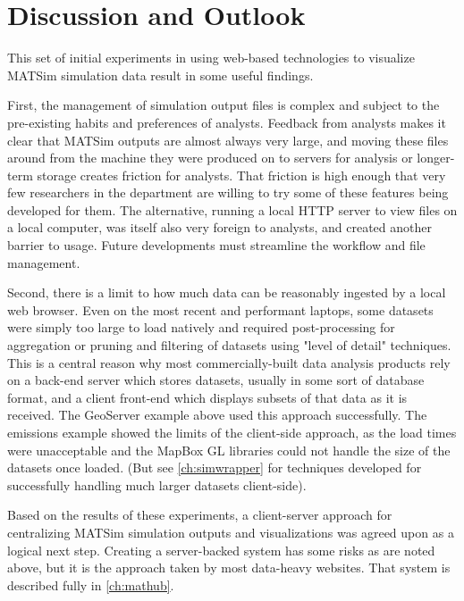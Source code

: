 \hypertarget{server-experiments-findings}{%
\section{Discussion and Outlook}\label{server-experiments-findings}}

This set of initial experiments in using web-based technologies to visualize MATSim simulation data result in some useful findings.

First, the management of simulation output files is complex and subject to the pre-existing habits and preferences of analysts. Feedback from analysts makes it clear that MATSim outputs are almost always very large, and moving these files around from the machine they were produced on to servers for analysis or longer-term storage creates friction for analysts. That friction is high enough that very few researchers in the department are willing to try some of these features being developed for them. The alternative, running a local HTTP server to view files on a local computer, was itself also very foreign to analysts, and created another barrier to usage. Future developments must streamline the workflow and file management.

Second, there is a limit to how much data can be reasonably ingested by a local web browser. Even on the most recent and performant laptops, some datasets were simply too large to load natively and required post-processing for aggregation or pruning and filtering of datasets using "level of detail" techniques. This is a central reason why most commercially-built data analysis products rely on a back-end server which stores datasets, usually in some sort of database format, and a client front-end which displays subsets of that data as it is received. The GeoServer example above used this approach successfully. The emissions example showed the limits of the client-side approach, as the load times were unacceptable and the MapBox GL libraries could not handle the size of the datasets once loaded. (But see \autoref{ch:simwrapper} for techniques developed for successfully handling much larger datasets client-side).

Based on the results of these experiments, a client-server approach for centralizing MATSim simulation outputs and visualizations was agreed upon as a logical next step. Creating a server-backed system has some risks as are noted above, but it is the approach taken by most data-heavy websites. That system is described fully in \autoref{ch:mathub}.

